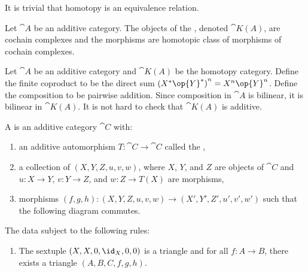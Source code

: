 \par
It is trivial that homotopy is an equivalence relation.
\begin{definition}
    Let $\cat{A}$ be an additive category. The objects of the , denoted $\cat{K(A)}$, are cochain complexes and the morphisms are homotopic class of morphisms of cochain complexes.
\end{definition}
\par
Let $\cat{A}$ be an additive category and $\cat{K(A)}$ be the homotopy category. Define the finite coproduct to be the direct sum ${({X}^{*}\op{Y}^{*})}^{n}={X}^{n}\op{Y}^{n}$. Define the composition to be pairwise addition. Since composition in $\cat{A}$ is bilinear, it is bilinear in $\cat{K(A)}$. It is not hard to check that $\cat{K(A)}$ is additive.
\begin{definition}
    A  is an additive category $\cat{C}$ with:
    \begin{enumerate}
        \item an additive automorphism $T:\cat{C}\to\cat{C}$ called the ,
        \item a collection of  $(X,Y,Z,u,v,w)$, where $X$, $Y$, and $Z$ are objects of $\cat{C}$ and $u:X\to Y$, $v:Y\to Z$, and $w:Z\to T(X)$ are morphisms,
        \item morphisms $(f,g,h):(X,Y,Z,u,v,w)\to(X',Y',Z',u',v',w')$ such that the following diagram commutes.
    \end{enumerate}
    \begin{center}
    \end{center}
    The data subject to the following rules:
    \begin{enumerate}
        \item The sextuple $(X,X,0,{\id}_{X},0,0)$ is a triangle and for all $f:A\to B$, there exists a triangle $(A,B,C,f,g,h)$.

\end{enumerate}
\end{definition}
